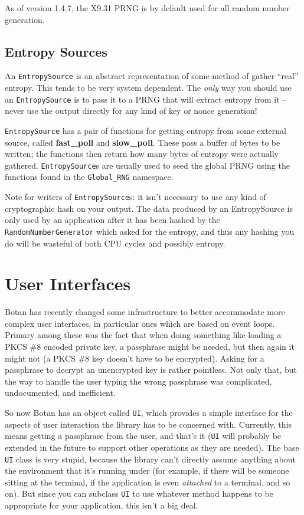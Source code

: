 \documentclass{article}
\newcommand{\function}[1]{\textbf{#1}}
\newcommand{\type}[1]{\texttt{#1}}
\newcommand{\namespace}[1]{\texttt{#1}}
\begin{document}
As of version 1.4.7, the X9.31 PRNG is by default used for all random number
generation.

\subsection{Entropy Sources}

An \type{EntropySource} is an abstract representation of some method of gather
``real'' entropy. This tends to be very system dependent. The \emph{only} way
you should use an \type{EntropySource} is to pass it to a PRNG that will
extract entropy from it -- never use the output directly for any kind of key or
nonce generation!

\type{EntropySource} has a pair of functions for getting entropy from some
external source, called \function{fast\_poll} and \function{slow\_poll}. These
pass a buffer of bytes to be written; the functions then return how many bytes
of entropy were actually gathered. \type{EntropySource}s are usually used to
seed the global PRNG using the functions found in the \namespace{Global\_RNG}
namespace.

Note for writers of \type{EntropySource}s: it isn't necessary to use any kind
of cryptographic hash on your output. The data produced by an EntropySource is
only used by an application after it has been hashed by the
\type{RandomNumberGenerator} which asked for the entropy, and thus any hashing
you do will be wasteful of both CPU cycles and possibly entropy.

\pagebreak
\section{User Interfaces}

Botan has recently changed some infrastructure to better accommodate more
complex user interfaces, in particular ones which are based on event
loops. Primary among these was the fact that when doing something like loading
a PKCS \#8 encoded private key, a passphrase might be needed, but then again it
might not (a PKCS \#8 key doesn't have to be encrypted). Asking for a
passphrase to decrypt an unencrypted key is rather pointless. Not only that,
but the way to handle the user typing the wrong passphrase was complicated,
undocumented, and inefficient.

So now Botan has an object called \type{UI}, which provides a simple interface
for the aspects of user interaction the library has to be concerned
with. Currently, this means getting a passphrase from the user, and that's it
(\type{UI} will probably be extended in the future to support other operations
as they are needed). The base \type{UI} class is very stupid, because the
library can't directly assume anything about the environment that it's running
under (for example, if there will be someone sitting at the terminal, if the
application is even \emph{attached} to a terminal, and so on). But since you
can subclass \type{UI} to use whatever method happens to be appropriate for
your application, this isn't a big deal.
\end{document}
